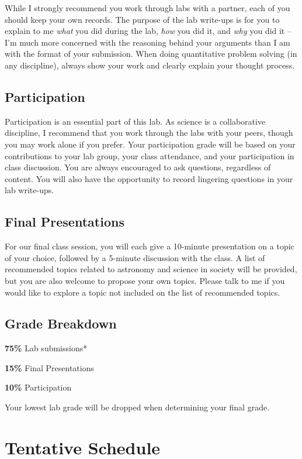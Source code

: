 \documentclass[11pt]{article}
\begin{document}
\noindent While I strongly recommend you work through labs with a partner, each of you should keep your own records. The purpose of the lab write-ups is for you to explain to me \textit{what} you did during the lab, \textit{how} you did it, and \textit{why} you did it -- I'm much more concerned with the reasoning behind your arguments than I am with the format of your submission. When doing quantitative problem solving (in any discipline), always show your work and clearly explain your thought process. 

\subsection*{Participation}
\noindent Participation is an essential part of this lab. As science is a collaborative discipline, I recommend that you work through the labs with your peers, though you may work alone if you prefer. Your participation grade will be based on your contributions to your lab group, your class attendance, and your participation in class discussion. You are always encouraged to ask questions, regardless of content. You will also have the opportunity to record lingering questions in your lab write-ups.

\subsection*{Final Presentations}
\noindent For our final class session, you will each give a 10-minute presentation on a topic of your choice, followed by a 5-minute discussion with the class. A list of recommended topics related to astronomy and science in society will be provided, but you are also welcome to propose your own topics. Please talk to me if you would like to explore a topic not included on the list of recommended topics.

\subsection*{Grade Breakdown}
\noindent \textbf{75\%} Lab submissions*

\noindent \textbf{15\%} Final Presentations

\noindent \textbf{10\%} Participation

\noindent *Your lowest lab grade will be dropped when determining your final grade.

\section*{Tentative Schedule}
\end{document}
